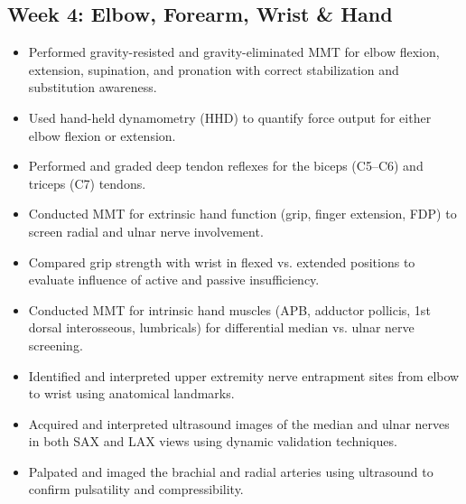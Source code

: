 \subsection*{Week 4: Elbow, Forearm, Wrist \& Hand}
\begin{itemize}
  \item [$\square$] Performed gravity-resisted and gravity-eliminated MMT for elbow flexion, extension, supination, and pronation with correct stabilization and substitution awareness.
  \item [$\square$] Used hand-held dynamometry (HHD) to quantify force output for either elbow flexion or extension.
  \item [$\square$] Performed and graded deep tendon reflexes for the biceps (C5–C6) and triceps (C7) tendons.
  \item [$\square$] Conducted MMT for extrinsic hand function (grip, finger extension, FDP) to screen radial and ulnar nerve involvement.
  \item [$\square$] Compared grip strength with wrist in flexed vs. extended positions to evaluate influence of active and passive insufficiency.
  \item [$\square$] Conducted MMT for intrinsic hand muscles (APB, adductor pollicis, 1st dorsal interosseous, lumbricals) for differential median vs. ulnar nerve screening.
  \item [$\square$] Identified and interpreted upper extremity nerve entrapment sites from elbow to wrist using anatomical landmarks.
  \item [$\square$] Acquired and interpreted ultrasound images of the median and ulnar nerves in both SAX and LAX views using dynamic validation techniques.
  \item [$\square$] Palpated and imaged the brachial and radial arteries using ultrasound to confirm pulsatility and compressibility.
\end{itemize}

